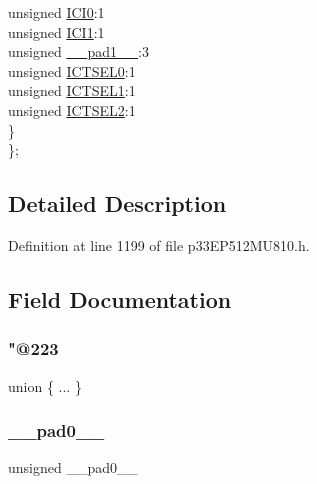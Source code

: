 \begin{DoxyCompactItemize}
\begin{tabbing}
\>\>unsigned \hyperlink{structtag_i_c13_c_o_n1_b_i_t_s_a6f1b5da2706b7c15fc8c9a01a30deaff}{ICI0}:1\\
\>\>unsigned \hyperlink{structtag_i_c13_c_o_n1_b_i_t_s_a7d5c777f0bc43f66f40462f79ed2179c}{ICI1}:1\\
\>\>unsigned \hyperlink{structtag_i_c13_c_o_n1_b_i_t_s_acaf2d0924a107ec6e8d2e31febaf66f9}{\_\_pad1\_\_}:3\\
\>\>unsigned \hyperlink{structtag_i_c13_c_o_n1_b_i_t_s_af6dd4d0e816b18462680d4b22fa926d3}{ICTSEL0}:1\\
\>\>unsigned \hyperlink{structtag_i_c13_c_o_n1_b_i_t_s_aa29140e739d886362537f87d199c4134}{ICTSEL1}:1\\
\>\>unsigned \hyperlink{structtag_i_c13_c_o_n1_b_i_t_s_a47d80892d449e6edbd5ba2ba9ff06deb}{ICTSEL2}:1\\
\>\} \\
\}; \\

\end{tabbing}\end{DoxyCompactItemize}


\subsection{Detailed Description}


Definition at line 1199 of file p33\+E\+P512\+M\+U810.\+h.



\subsection{Field Documentation}
\mbox{\label{structtag_i_c13_c_o_n1_b_i_t_s_ac4cc29151ac2b0402b7f4856f68e917c}} 
\subsubsection{\texorpdfstring{"@223}{@223}}
{\footnotesize\ttfamily union \{ ... \} }

\mbox{\label{structtag_i_c13_c_o_n1_b_i_t_s_adf71f3d8410c1f1dbbc96680a92c49af}} 
\subsubsection{\texorpdfstring{\+\_\+\+\_\+pad0\+\_\+\+\_\+}{\_\_pad0\_\_}}
{\footnotesize\ttfamily unsigned \+\_\+\+\_\+pad0\+\_\+\+\_\+}



